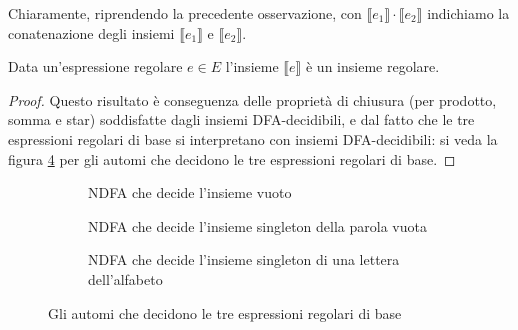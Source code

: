 \begin{rema}
    Chiaramente, riprendendo la precedente osservazione, con $\llbracket e_1\rrbracket\cdot\llbracket e_2\rrbracket$ indichiamo la conatenazione degli insiemi $\llbracket e_1\rrbracket$ e $\llbracket e_2\rrbracket$.
\end{rema}

\begin{prop} Data un’espressione regolare $e\in E$ l’insieme $\llbracket e \rrbracket$ è un insieme regolare.
\begin{proof} Questo risultato è conseguenza delle proprietà di chiusura (per prodotto, somma e star)
soddisfatte dagli insiemi DFA-decidibili, e dal fatto che le tre espressioni regolari di base si interpretano
con insiemi DFA-decidibili: si veda la figura 
\ref{fig:automi-base} per gli automi che decidono le tre espressioni regolari di base.
\end{proof}
\end{prop}
\begin{figure}[H]
\centering
\begin{subfigure}[t]{0.3\textwidth}
    \centering
    \caption{NDFA che decide l'insieme vuoto}
    \label{fig:ndfa-vuoto}
\end{subfigure}
\hfill
\begin{subfigure}[t]{0.3\textwidth}
    \centering
    \caption{NDFA che decide l'insieme singleton della parola vuota}
    \label{fig:ndfa-epsilon}
\end{subfigure}
\hfill
\begin{subfigure}[t]{0.36\textwidth}
    \centering
    \caption{NDFA che decide l'insieme singleton di una lettera dell'alfabeto}
    \label{fig:ndfa-lettera}
\end{subfigure}
\caption{Gli automi che decidono le tre espressioni regolari di base}
\label{fig:automi-base}
\end{figure}
